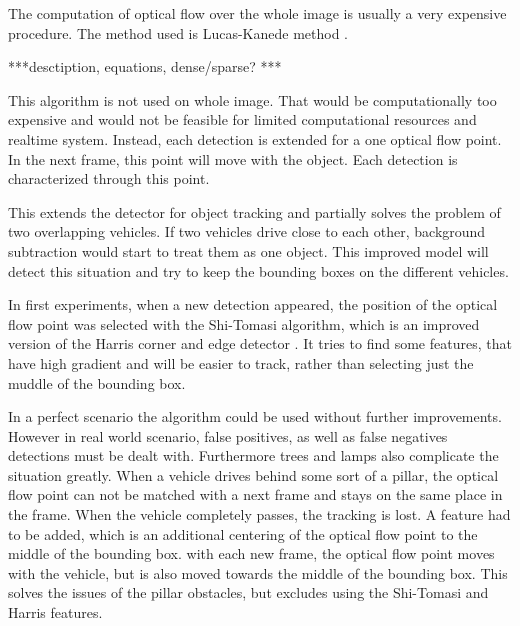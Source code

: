 \documentclass[a4paper,12pt,titlepage]{article}
\numberwithin{figure}{section}
\begin{document}
The computation of optical flow over the whole image is usually a very expensive procedure. The method used is Lucas-Kanede method \cite{lucas-kanede}. 

***desctiption, equations, dense/sparse? ***


This algorithm is not used on whole image. That would be computationally too expensive and would not be feasible for limited computational resources and realtime system. Instead, each detection is extended for a one optical flow point. In the next frame, this point will move with the object. Each detection is characterized through this point. 

This extends the detector for object tracking and partially solves the problem of two overlapping vehicles. If two vehicles drive close to each other, background subtraction would start to treat them as one object. This improved model will detect this situation and try to keep the bounding boxes on the different vehicles. 

In first experiments, when a new detection appeared, the position of the optical flow point was selected with the Shi-Tomasi \cite{shi-tomasi} algorithm, which is an improved version of the Harris corner and edge detector \cite{harris}. It tries to find some features, that have high gradient and will be easier to track, rather than selecting just the muddle of the bounding box.



In a perfect scenario the algorithm could be used without further improvements. However in real world scenario, false positives, as well as false negatives detections must be dealt with. Furthermore trees and lamps also complicate the situation greatly. When a vehicle drives behind some sort of a pillar, the optical flow point can not be matched with a next frame and stays on the same place in the frame. When the vehicle completely passes, the tracking is lost. A feature had to be added, which is an additional centering of the optical flow point to the middle of the bounding box. with each new frame, the optical flow point moves with the vehicle, but is also moved towards the middle of the bounding box. This solves the issues of the pillar obstacles, but excludes using the Shi-Tomasi and Harris features. 
\end{document}

